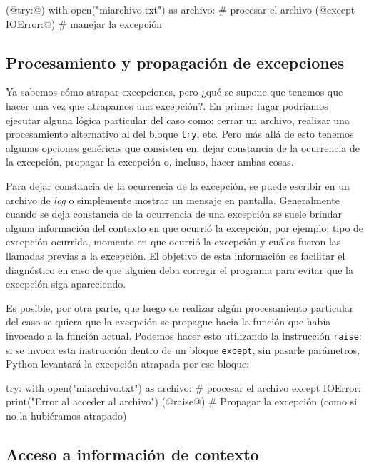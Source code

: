 \begin{codigo-python-sn}
(@try:@)
    with open("miarchivo.txt") as archivo:
        # procesar el archivo
(@except IOError:@)
    # manejar la excepción
\end{codigo-python-sn}

\subsection{Procesamiento y propagación de excepciones}

Ya sabemos cómo atrapar excepciones, pero ¿qué se supone que tenemos que hacer
una vez que atrapamos una excepción?. En primer lugar podríamos
ejecutar alguna lógica particular del caso como: cerrar un archivo,
realizar una procesamiento alternativo al del bloque \lstinline!try!, etc.
Pero más allá de esto tenemos algunas opciones genéricas que consisten en:
dejar constancia de la ocurrencia de la excepción, propagar la excepción o,
incluso, hacer ambas cosas.

Para dejar constancia de la ocurrencia de la excepción, se puede escribir
en un archivo de \emph{log} o simplemente mostrar un mensaje en pantalla.
Generalmente cuando se deja constancia de la ocurrencia de una excepción se
suele brindar alguna información del contexto en que ocurrió la excepción,
por ejemplo: tipo de excepción ocurrida, momento en que ocurrió la
excepción y cuáles fueron las llamadas previas a la excepción. El objetivo
de esta información es facilitar el diagnóstico en caso de que alguien deba
corregir el programa para evitar que la excepción siga apareciendo.

Es posible, por otra parte, que luego de realizar algún procesamiento
particular del caso se quiera que la excepción se propague hacia la función
que había invocado a la función actual. Podemos hacer esto utilizando
la instrucción \lstinline!raise!: si se invoca esta instrucción dentro de un
bloque \lstinline!except!, sin pasarle parámetros, Python levantará la
excepción atrapada por ese bloque:

\begin{codigo-python-sn}
try:
    with open("miarchivo.txt") as archivo:
        # procesar el archivo
except IOError:
    print("Error al acceder al archivo")
    (@raise@) # Propagar la excepción (como si no la hubiéramos atrapado)
\end{codigo-python-sn}

\subsection{Acceso a información de contexto}

